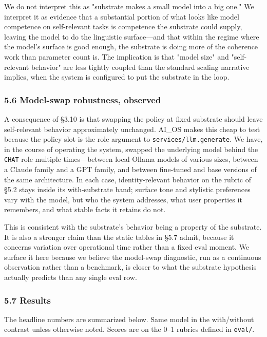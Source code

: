 \documentclass[11pt,letterpaper]{article}
\begin{document}
We do not interpret this as "substrate makes a small model into a big one." We interpret it as evidence that a substantial portion of what looks like model competence on self-relevant tasks is competence the substrate could supply, leaving the model to do the linguistic surface---and that within the regime where the model's surface is good enough, the substrate is doing more of the coherence work than parameter count is. The implication is that "model size" and "self-relevant behavior" are less tightly coupled than the standard scaling narrative implies, when the system is configured to put the substrate in the loop.

\subsubsection*{5.6 Model-swap robustness, observed}

A consequence of §3.10 is that swapping the policy at fixed substrate should leave self-relevant behavior approximately unchanged. AI\_OS makes this cheap to test because the policy slot is the role argument to \texttt{services/llm.generate}. We have, in the course of operating the system, swapped the underlying model behind the \texttt{CHAT} role multiple times---between local Ollama models of various sizes, between a Claude family and a GPT family, and between fine-tuned and base versions of the same architecture. In each case, identity-relevant behavior on the rubric of §5.2 stays inside its with-substrate band; surface tone and stylistic preferences vary with the model, but who the system addresses, what user properties it remembers, and what stable facts it retains do not.

This is consistent with the substrate's behavior being a property of the substrate. It is also a stronger claim than the static tables in §5.7 admit, because it concerns variation over operational time rather than a fixed eval moment. We surface it here because we believe the model-swap diagnostic, run as a continuous observation rather than a benchmark, is closer to what the substrate hypothesis actually predicts than any single eval row.

\subsubsection*{5.7 Results}

The headline numbers are summarized below. Same model in the with/without contrast unless otherwise noted. Scores are on the 0–1 rubrics defined in \texttt{eval/}.
\end{document}
